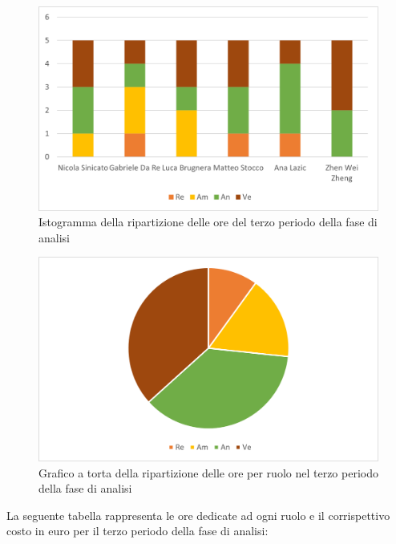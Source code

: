 \begin{figure}[H]
    \centering
    \includegraphics[scale=0.6]{img/grafi preventivo/istogrammi/analisi/periodo3.png}
    \caption{Istogramma della ripartizione delle ore del terzo periodo della fase di analisi}
\end{figure}
\begin{figure}[H]
    \centering
    \includegraphics[scale=0.6]{img/grafi preventivo/torta/analisi/periodo3.png}
    \caption{Grafico a torta della ripartizione delle ore per ruolo nel terzo periodo della fase di analisi}
\end{figure}
La seguente tabella rappresenta le ore dedicate ad ogni ruolo e il corrispettivo costo in euro per il terzo periodo della fase di analisi:

